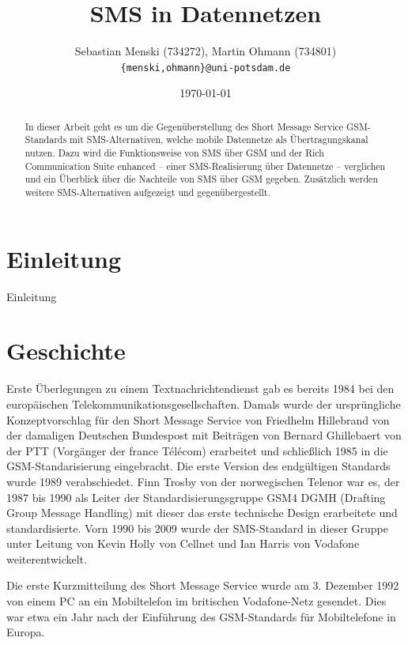 \documentclass[german,12pt,a4paper]{article}
\begin{document}
\title{\textbf{SMS in Datennetzen}}
\author{Sebastian Menski (734272), Martin Ohmann (734801) \\ \texttt{\{menski,ohmann\}@uni-potsdam.de}}
\date{\today}

\maketitle

\begin{abstract}
In dieser Arbeit geht es um die Gegenüberstellung des Short Message Service 
GSM-Standards mit SMS-Alternativen, welche mobile Datennetze als Übertragungskanal 
nutzen. Dazu wird die Funktionsweise von SMS über GSM und der Rich Communication Suite enhanced 
-- einer SMS-Realisierung über Datennetze -- verglichen und ein Überblick über die Nachteile 
von SMS über GSM gegeben. Zusätzlich werden weitere SMS-Alternativen aufgezeigt und gegenübergestellt.
\end{abstract}

\section{Einleitung}
Einleitung

\section{Geschichte}
Erste Überlegungen zu einem Textnachrichtendienst gab es bereits 1984 bei den 
europäischen Telekommunikationsgesellschaften. Damals wurde der ursprüngliche 
Konzeptvorschlag für den Short Message Service von Friedhelm Hillebrand von der 
damaligen Deutschen Bundespost mit Beiträgen von Bernard Ghillebaert von der PTT 
(Vorgänger der france Télécom) erarbeitet und schließlich 1985 in die 
GSM-Standarisierung eingebracht. Die erste Version des endgültigen Standards 
wurde 1989 verabschiedet. Finn Trosby von der norwegischen Telenor war es, der 
1987 bis 1990 als Leiter der Standardisierungsgruppe GSM4 DGMH (Drafting Group 
Message Handling) mit dieser das erste technische Design erarbeitete und 
standardisierte.
Vorn 1990 bis 2009 wurde der SMS-Standard in dieser Gruppe unter Leitung von 
Kevin Holly von Cellnet und Ian Harris von Vodafone weiterentwickelt.

Die erste Kurzmitteilung des Short Message Service wurde am 3. Dezember 1992 
von einem PC an ein Mobiltelefon im britischen Vodafone-Netz gesendet. Dies 
war etwa ein Jahr nach der Einführung des GSM-Standards für Mobiltelefone in 
Europa.
\end{document}
